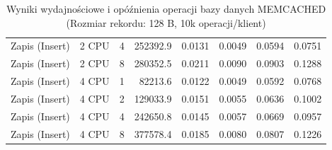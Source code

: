 \begin{table}[ht]
{\begin{tabular}{llcrrrrr}
Zapis (Insert) & 2 CPU & 4 & 252392.9 & 0.0131 & 0.0049 & 0.0594 & 0.0751 \\
Zapis (Insert) & 2 CPU & 8 & 280352.5 & 0.0211 & 0.0090 & 0.0903 & 0.1288 \\
Zapis (Insert) & 4 CPU & 1 & 82213.6 & 0.0122 & 0.0049 & 0.0592 & 0.0768 \\
Zapis (Insert) & 4 CPU & 2 & 129033.9 & 0.0151 & 0.0055 & 0.0636 & 0.1002 \\
Zapis (Insert) & 4 CPU & 4 & 242650.8 & 0.0145 & 0.0057 & 0.0669 & 0.0957 \\
Zapis (Insert) & 4 CPU & 8 & 377578.4 & 0.0185 & 0.0080 & 0.0807 & 0.1226 \\
\bottomrule
\end{tabular}%
}
\caption{Wyniki wydajnościowe i opóźnienia operacji bazy danych MEMCACHED (Rozmiar rekordu: 128 B, 10k operacji/klient)}
\label{tab:latency_memcached_small_10000}
\end{table}
